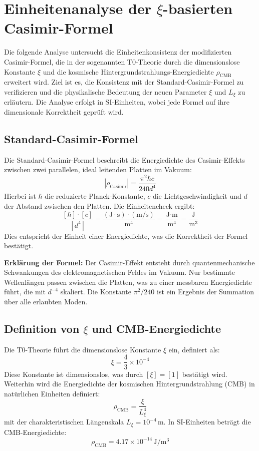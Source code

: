 \documentclass[12pt,a4paper]{article}
\begin{document}
	\section{Einheitenanalyse der $\xi$-basierten Casimir-Formel}
Die folgende Analyse untersucht die Einheitenkonsistenz der modifizierten Casimir-Formel, die in der sogenannten T0-Theorie durch die dimensionslose Konstante $\xi$ und die kosmische Hintergrundstrahlungs-Energiedichte $\rho_{\text{CMB}}$ erweitert wird. Ziel ist es, die Konsistenz mit der Standard-Casimir-Formel zu verifizieren und die physikalische Bedeutung der neuen Parameter $\xi$ und $L_\xi$ zu erläutern. Die Analyse erfolgt in SI-Einheiten, wobei jede Formel auf ihre dimensionale Korrektheit geprüft wird.

\subsection{Standard-Casimir-Formel}
Die Standard-Casimir-Formel beschreibt die Energiedichte des Casimir-Effekts zwischen zwei parallelen, ideal leitenden Platten im Vakuum:
\begin{equation}
	|\rho_{\text{Casimir}}| = \frac{\pi^2 \hbar c}{240 d^4}
\end{equation}
Hierbei ist $\hbar$ die reduzierte Planck-Konstante, $c$ die Lichtgeschwindigkeit und $d$ der Abstand zwischen den Platten. Die Einheitencheck ergibt:
\begin{equation}
	\frac{[\hbar] \cdot [c]}{[d^4]} = \frac{(\text{J} \cdot \text{s}) \cdot (\text{m}/\text{s})}{\text{m}^4} = \frac{\text{J} \cdot \text{m}}{\text{m}^4} = \frac{\text{J}}{\text{m}^3}
\end{equation}
Dies entspricht der Einheit einer Energiedichte, was die Korrektheit der Formel bestätigt.

\textbf{Erklärung der Formel:} Der Casimir-Effekt entsteht durch quantenmechanische Schwankungen des elektromagnetischen Feldes im Vakuum. Nur bestimmte Wellenlängen passen zwischen die Platten, was zu einer messbaren Energiedichte führt, die mit $d^{-4}$ skaliert. Die Konstante $\pi^2/240$ ist ein Ergebnis der Summation über alle erlaubten Moden.

\subsection{Definition von $\xi$ und CMB-Energiedichte}
Die T0-Theorie führt die dimensionslose Konstante $\xi$ ein, definiert als:
\begin{equation}
	\xi = \frac{4}{3} \times 10^{-4}
\end{equation}
Diese Konstante ist dimensionslos, was durch $[ \xi ] = [1]$ bestätigt wird. Weiterhin wird die Energiedichte der kosmischen Hintergrundstrahlung (CMB) in natürlichen Einheiten definiert:
\begin{equation}
	\rho_{\text{CMB}} = \frac{\xi}{L_\xi^4}
\end{equation}
mit der charakteristischen Längenskala $L_\xi = 10^{-4} \, \text{m}$. In SI-Einheiten beträgt die CMB-Energiedichte:
\begin{equation}
	\rho_{\text{CMB}} = 4.17 \times 10^{-14} \, \text{J}/\text{m}^3
\end{equation}
\end{document}
